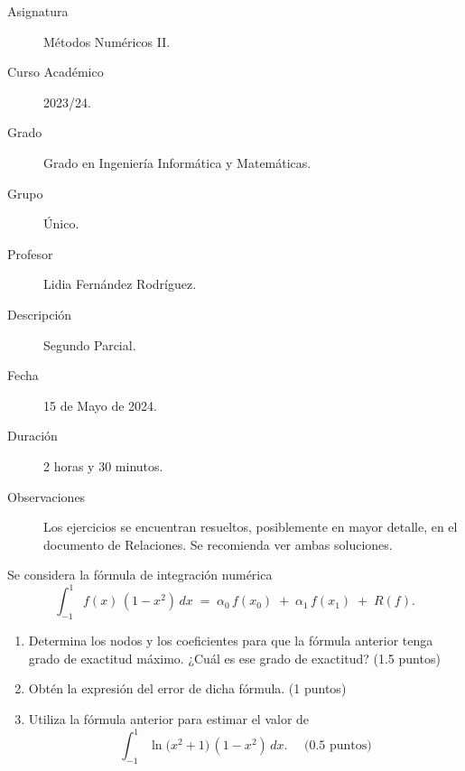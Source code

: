 \documentclass[12pt]{article}
\begin{document}

    
    

    \begin{description}
        \item[Asignatura] Métodos Numéricos II.
        \item[Curso Académico] 2023/24.
        \item[Grado] Grado en Ingeniería Informática y Matemáticas.
        \item[Grupo] Único.
        \item[Profesor] Lidia Fernández Rodríguez.
        \item[Descripción] Segundo Parcial.
        \item[Fecha] 15 de Mayo de 2024.
        \item[Duración] 2 horas y 30 minutos.
        \item[Observaciones] Los ejercicios se encuentran resueltos, posiblemente en mayor detalle, en el documento de Relaciones. Se recomienda ver ambas soluciones.
    \end{description}
    \newpage


    
    \begin{ejercicio}[3 puntos]
        Se considera la fórmula de integración numérica
        \[
        \int_{-1}^{1} f(x)\,(1 - x^2)\,dx \;=\; \alpha_0\,f(x_0)\;+\;\alpha_1\,f(x_1)\;+\;R(f).
        \]
        \begin{enumerate}
          \item Determina los nodos y los coeficientes para que la fórmula anterior tenga grado de exactitud máximo. ¿Cuál es ese grado de exactitud? (1.5 puntos)
          \item Obtén la expresión del error de dicha fórmula. (1 puntos)
          \item Utiliza la fórmula anterior para estimar el valor de
          \[
            \int_{-1}^{1} \ln\bigl(x^2+1\bigr)\,(1 - x^2)\,dx. \quad \text{ (0.5 puntos)}
          \]
        \end{enumerate}
    \end{ejercicio}
        
\end{document}
